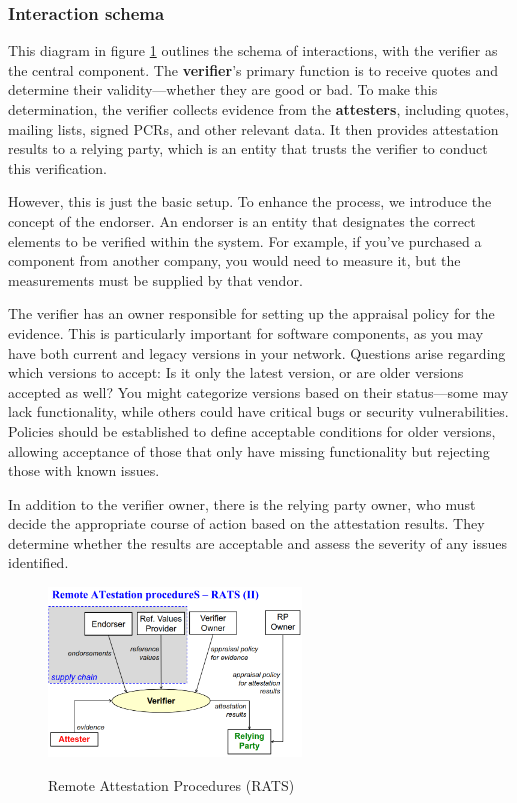 \subsubsection{Interaction schema}

This diagram in figure \ref{fig:rats} outlines the schema of
interactions, with the verifier as the central component. The
\textbf{verifier}'s primary function is to receive quotes and
determine their validity—whether they are good or bad. To make this
determination, the verifier collects evidence from the
\textbf{attesters}, including quotes, mailing lists, signed PCRs, and
other relevant data. It then provides attestation results to a relying
party, which is an entity that trusts the verifier to conduct this
verification.

However, this is just the basic setup. To enhance the process, we
introduce the concept of the endorser. An endorser is an entity that
designates the correct elements to be verified within the system. For
example, if you've purchased a component from another company, you
would need to measure it, but the measurements must be supplied by
that vendor.

The verifier has an owner responsible for setting up the appraisal
policy for the evidence. This is particularly important for software
components, as you may have both current and legacy versions in your
network. Questions arise regarding which versions to accept: Is it
only the latest version, or are older versions accepted as well? You might
categorize versions based on their status—some may lack functionality,
while others could have critical bugs or security vulnerabilities.
Policies should be established to define acceptable conditions for
older versions, allowing acceptance of those that only have missing
functionality but rejecting those with known issues.

In addition to the verifier owner, there is the relying party owner,
who must decide the appropriate course of action based on the
attestation results. They determine whether the results are acceptable
and assess the severity of any issues identified.

\begin{figure}[H]
  \centering
  \includegraphics[width=0.6\textwidth]{img/RATS.png}
  \label{fig:rats}
  \caption{Remote Attestation Procedures (RATS)}
\end{figure}


